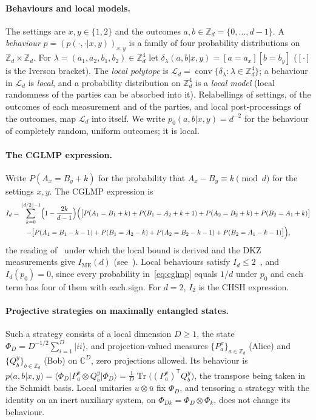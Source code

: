 \documentclass[11pt]{article}
\theoremstyle{remark}
\numberwithin{equation}{section}
\newcommand{\Z}{\mathbb{Z}}
\newcommand{\C}{\mathbb{C}}
\newcommand{\Tr}{\operatorname{Tr}}
\newcommand{\IME}{I_{\mathrm{ME}}}
\newcommand{\cL}{\mathcal{L}}
\begin{document}
\paragraph{Behaviours and local models.}
The settings are $x,y\in\{1,2\}$ and the outcomes $a,b\in\Z_d=\{0,\dots,d-1\}$. A \emph{behaviour}
$p=(p(\cdot,\cdot|x,y))_{x,y}$ is a family of four probability distributions on $\Z_d\times\Z_d$. For
$\lambda=(a_1,a_2,b_1,b_2)\in\Z_d^4$ let $\delta_\lambda(a,b|x,y)=[a=a_x][b=b_y]$ ($[\cdot]$ is the Iverson bracket).
The \emph{local polytope} is $\cL_d=\operatorname{conv}\{\delta_\lambda:\lambda\in\Z_d^4\}$; a behaviour in $\cL_d$ is
\emph{local}, and a probability distribution on $\Z_d^4$ is a \emph{local model} (local randomness of the parties can
be absorbed into it). Relabellings of settings, of the outcomes of each measurement and of the parties, and local
post-processings of the outcomes, map $\cL_d$ into itself. We write $p_0(a,b|x,y)=d^{-2}$ for the behaviour of
completely random, uniform outcomes; it is local.

\paragraph{The CGLMP expression.}
Write $P(A_x=B_y+k)$ for the probability that $A_x-B_y\equiv k\pmod d$ for the settings $x,y$. The CGLMP expression is
\begin{multline}\label{eq:cglmp}
I_d=\sum_{k=0}^{\lfloor d/2\rfloor-1}\Bigl(1-\frac{2k}{d-1}\Bigr)\Bigl(\bigl[P(A_1=B_1+k)+P(B_1=A_2+k+1)
+P(A_2=B_2+k)+P(B_2=A_1+k)\bigr]\\
-\bigl[P(A_1=B_1-k-1)+P(B_1=A_2-k)+P(A_2=B_2-k-1)+P(B_2=A_1-k-1)\bigr]\Bigr),
\end{multline}
the reading of~\cite{CGLMP} under which the local bound is derived and the DKZ measurements give $\IME(d)$
(see~\cite[Section~2]{MSclassical}). Local behaviours satisfy $I_d\le2$~\cite{CGLMP}, and $I_d(p_0)=0$, since every
probability in~\eqref{eq:cglmp} equals $1/d$ under $p_0$ and each term has four of them with each sign. For $d=2$,
$I_2$ is the CHSH expression.

\paragraph{Projective strategies on maximally entangled states.}
Such a strategy consists of a local dimension $D\ge1$, the state $\Phi_D=D^{-1/2}\sum_{i=1}^D|ii\rangle$, and
projection-valued measures $\{P^x_a\}_{a\in\Z_d}$ (Alice) and $\{Q^y_b\}_{b\in\Z_d}$ (Bob) on $\C^D$, zero projections
allowed. Its behaviour is $p(a,b|x,y)=\langle\Phi_D|P^x_a\otimes Q^y_b|\Phi_D\rangle=\frac1D\Tr\bigl((P^x_a)^{\mathsf
T}Q^y_b\bigr)$, the transpose being taken in the Schmidt basis. Local unitaries $u\otimes\bar u$ fix $\Phi_D$, and
tensoring a strategy with the identity on an inert auxiliary system, on $\Phi_{Dk}=\Phi_D\otimes\Phi_k$, does not change
its behaviour.
\end{document}
